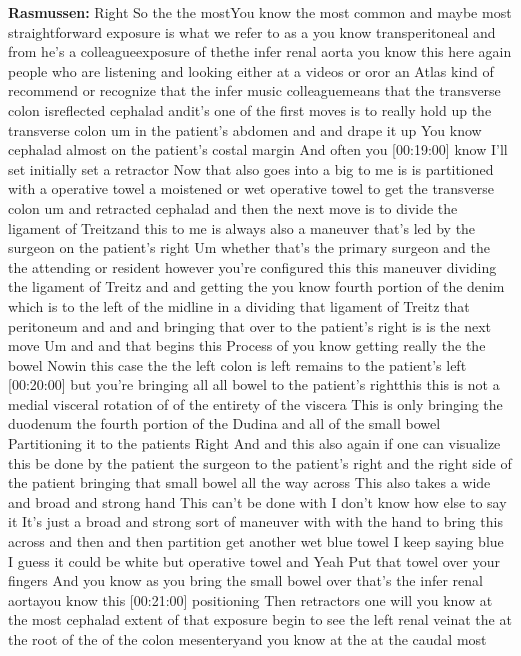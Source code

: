 \documentclass[
]{book}
\begin{document}
\textbf{Rasmussen:} Right So the the mostYou know the most common and maybe
most straightforward exposure is what we refer to as a you know
transperitoneal and from he's a colleagueexposure of thethe infer renal
aorta you know this here again people who are listening and looking
either at a videos or oror an Atlas kind of recommend or recognize that
the infer music colleaguemeans that the transverse colon isreflected
cephalad andit's one of the first moves is to really hold up the
transverse colon um in the patient's abdomen and and drape it up You
know cephalad almost on the patient's costal margin And often you
{[}00:19:00{]} know I'll set initially set a retractor Now that also goes
into a big to me is is partitioned with a operative towel a moistened or
wet operative towel to get the transverse colon um and retracted
cephalad and then the next move is to divide the ligament of Treitzand
this to me is always also a maneuver that's led by the surgeon on the
patient's right Um whether that's the primary surgeon and the the
attending or resident however you're configured this this maneuver
dividing the ligament of Treitz and and getting the you know fourth
portion of the denim which is to the left of the midline in a dividing
that ligament of Treitz that peritoneum and and and bringing that over
to the patient's right is is the next move Um and and that begins this
Process of you know getting really the the bowel Nowin this case the the
left colon is left remains to the patient's left {[}00:20:00{]} but you're
bringing all all bowel to the patient's rightthis this is not a medial
visceral rotation of of the entirety of the viscera This is only
bringing the duodenum the fourth portion of the Dudina and all of the
small bowel Partitioning it to the patients Right And and this also
again if one can visualize this be done by the patient the surgeon to
the patient's right and the right side of the patient bringing that
small bowel all the way across This also takes a wide and broad and
strong hand This can't be done with I don't know how else to say it It's
just a broad and strong sort of maneuver with with the hand to bring
this across and then and then partition get another wet blue towel I
keep saying blue I guess it could be white but operative towel and Yeah
Put that towel over your fingers And you know as you bring the small
bowel over that's the infer renal aortayou know this {[}00:21:00{]}
positioning Then retractors one will you know at the most cephalad
extent of that exposure begin to see the left renal veinat the at the
root of the of the colon mesenteryand you know at the at the caudal most
\end{document}
